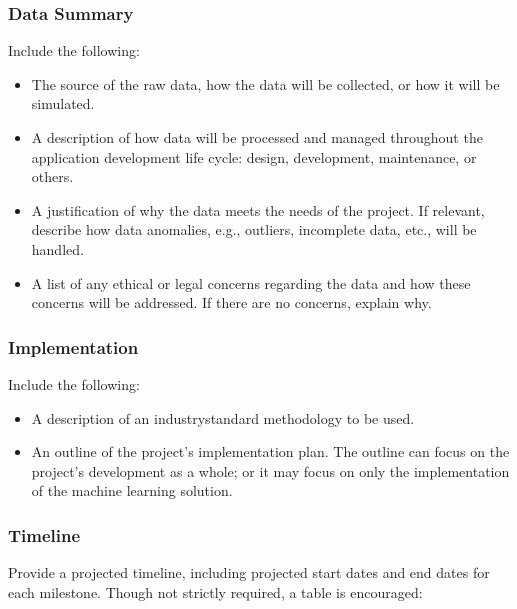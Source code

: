 \documentclass[letterpaper,10pt,english]{jupyterBook}
\begin{document}
\subsubsection{Data Summary}
\label{\detokenize{task2_doc/task2_doc_a_and_b:data-summary}}
\sphinxAtStartPar
Include the following:
\begin{itemize}
\item {} 
\sphinxAtStartPar
The source of the raw data, how the data will be collected, or how it will be simulated.

\item {} 
\sphinxAtStartPar
A description of how data will be processed and managed throughout the application development life cycle: design, development, maintenance, or others.

\item {} 
\sphinxAtStartPar
A justification of why the data meets the needs of the project. If relevant, describe how data anomalies, e.g., outliers, incomplete data, etc., will be handled.

\item {} 
\sphinxAtStartPar
A list of any ethical or legal concerns regarding the data and how these concerns will be addressed. If there are no concerns, explain why.

\end{itemize}


\subsubsection{Implementation}
\label{\detokenize{task2_doc/task2_doc_a_and_b:implementation}}
\sphinxAtStartPar
Include the following:
\begin{itemize}
\item {} 
\sphinxAtStartPar
A description of an industry\sphinxhyphen{}standard methodology to be used.

\item {} 
\sphinxAtStartPar
An outline of the project’s implementation plan. The outline can focus on the project’s development as a whole; or it may focus on only the implementation of the machine learning solution.

\end{itemize}


\subsubsection{Timeline}
\label{\detokenize{task2_doc/task2_doc_a_and_b:timeline}}
\sphinxAtStartPar
Provide a projected timeline, including projected start dates and end dates for each milestone. Though not strictly required, a table is encouraged:
\end{document}
